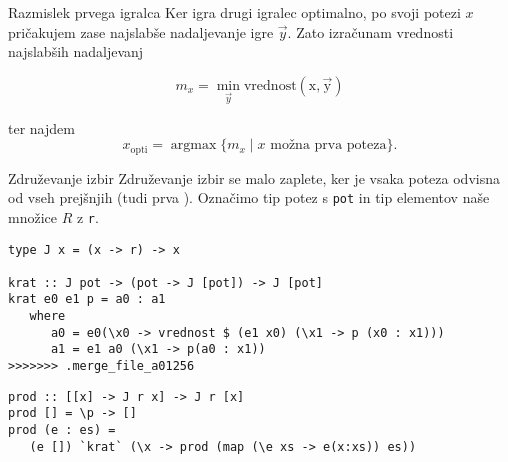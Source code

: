 \documentclass{beamer}
\newcommand{\argmax}{\operatorname{argmax}}
\begin{document}
\begin{frame}{Razmislek prvega igralca}
Ker igra drugi igralec optimalno, po svoji potezi $x$ pričakujem zase najslabše nadaljevanje igre $\vec{y}$. Zato izračunam vrednosti najslabših nadaljevanj

$$m_x =\min_{\vec{y}} \operatorname{vrednost(x,\vec{y})}$$

ter najdem $$x_{\text{opti}} = \argmax \{m_x\mid x \text{ možna prva poteza} \}\text{.}$$



\end{frame}

\begin{frame}[fragile]{Združevanje izbir}%
Združevanje izbir se malo zaplete, ker je vsaka poteza odvisna od vseh prejšnjih (tudi prva \smiley).
Označimo tip potez s \texttt{pot} in tip elementov naše množice $R$ z \texttt{r}.
\pause
\begin{lstlisting}
type J x = (x -> r) -> x

krat :: J pot -> (pot -> J [pot]) -> J [pot]
krat e0 e1 p = a0 : a1
   where
      a0 = e0(\x0 -> vrednost $ (e1 x0) (\x1 -> p (x0 : x1)))
      a1 = e1 a0 (\x1 -> p(a0 : x1))
>>>>>>> .merge_file_a01256
\end{lstlisting}
\pause
\begin{lstlisting}
prod :: [[x] -> J r x] -> J r [x]
prod [] = \p -> []
prod (e : es) =  
   (e []) `krat` (\x -> prod (map (\e xs -> e(x:xs)) es))
\end{lstlisting}
\end{frame}
\end{document}
